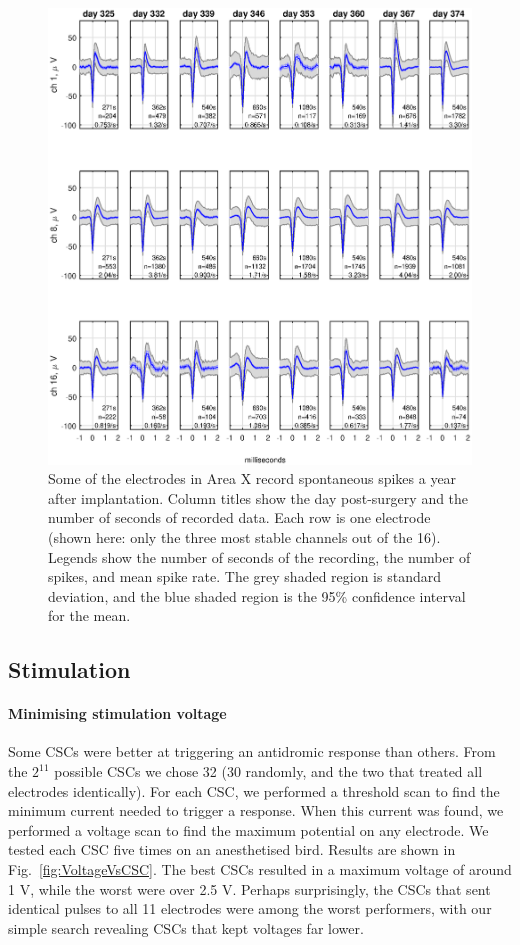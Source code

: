\documentclass[10pt,letterpaper]{article}
\newcommand\fig[1]{Fig.~\ref{#1}}
\renewcommand{\subsubsection}[1]{\paragraph{#1}}
\begin{document}
\begin{figure}
  \includegraphics[width=\textwidth]{XSpikeRecording}
  \caption{Some of the electrodes in Area X record spontaneous spikes a year after implantation.  Column titles show the day post-surgery and the number of seconds of recorded data.  Each row is one electrode (shown here: only the three most stable channels out of the 16).  Legends show the number of seconds of the recording, the number of spikes, and mean spike rate.  The grey shaded region is standard deviation, and the blue shaded region is the 95\% confidence interval for the mean.}
  \label{fig:XSpikeRecording}
\end{figure}


\subsection{Stimulation}

\subsubsection{Minimising stimulation voltage}

Some CSCs were better at triggering an antidromic response than others.  From the $2^{11}$ possible CSCs we chose 32 (30 randomly, and the two that treated all electrodes identically).  For each CSC, we performed a threshold scan to find the minimum current needed to trigger a response.  When this current was found, we performed a voltage scan to find the maximum potential on any electrode.  We tested each CSC five times on an anesthetised bird.  Results are shown in \fig{fig:VoltageVsCSC}.  The best CSCs resulted in a maximum voltage of around 1 V, while the worst were over 2.5 V.  Perhaps surprisingly, the CSCs that sent identical pulses to all 11 electrodes were among the worst performers, with our simple search revealing CSCs that kept voltages far lower.
\end{document}
